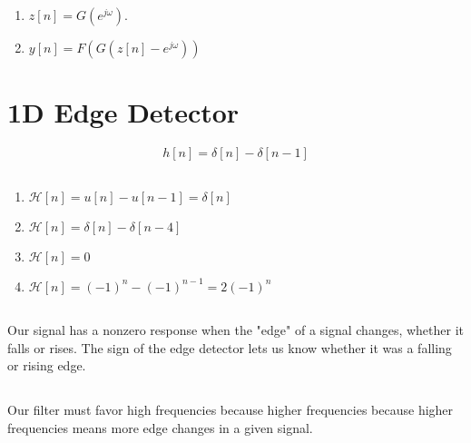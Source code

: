 \documentclass{article}
\renewcommand{\labelenumi}{\arabic{enumi}.}
\begin{document}
\begin{enumerate}
    \item \(z[n] = G(e^{j \omega})\).
    \item \(y[n] = F(G(z[n] - e^{j \omega}))\)
\end{enumerate}

\subsection{}

\section{1D Edge Detector}

\begin{equation}
    h[n] = \delta[n] - \delta[n - 1]
\end{equation}

\subsection{}

\renewcommand{\labelenumi}{\alph{enumi}.}
\begin{enumerate}
    \item \(\mathcal{H}[n] = u[n] - u[n - 1] = \delta[n]\)
    \item \(\mathcal{H}[n] = \delta[n] - \delta[n - 4]\)
    \item \(\mathcal{H}[n] = 0\)
    \item \(\mathcal{H}[n] = (-1)^n - (-1)^{n - 1} = 2(-1)^n\)
\end{enumerate}

\subsection{}

Our signal has a nonzero response when the "edge" of a signal changes, whether it falls or rises.
The sign of the edge detector lets us know whether it was a falling or rising edge.

\subsection{}

Our filter must favor high frequencies because higher frequencies because higher frequencies means more edge changes in a given signal.

\subsection{}
\end{document}
